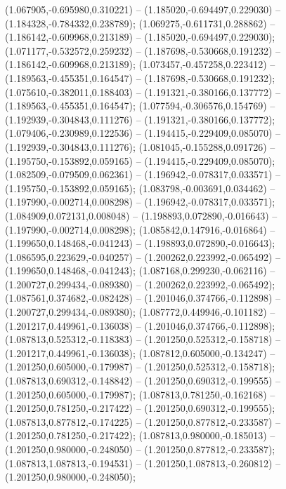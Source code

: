  (1.067905,-0.695980,0.310221) -- (1.185020,-0.694497,0.229030) -- (1.184328,-0.784332,0.238789);
 (1.069275,-0.611731,0.288862) -- (1.186142,-0.609968,0.213189) -- (1.185020,-0.694497,0.229030);
 (1.071177,-0.532572,0.259232) -- (1.187698,-0.530668,0.191232) -- (1.186142,-0.609968,0.213189);
 (1.073457,-0.457258,0.223412) -- (1.189563,-0.455351,0.164547) -- (1.187698,-0.530668,0.191232);
 (1.075610,-0.382011,0.188403) -- (1.191321,-0.380166,0.137772) -- (1.189563,-0.455351,0.164547);
 (1.077594,-0.306576,0.154769) -- (1.192939,-0.304843,0.111276) -- (1.191321,-0.380166,0.137772);
 (1.079406,-0.230989,0.122536) -- (1.194415,-0.229409,0.085070) -- (1.192939,-0.304843,0.111276);
 (1.081045,-0.155288,0.091726) -- (1.195750,-0.153892,0.059165) -- (1.194415,-0.229409,0.085070);
 (1.082509,-0.079509,0.062361) -- (1.196942,-0.078317,0.033571) -- (1.195750,-0.153892,0.059165);
 (1.083798,-0.003691,0.034462) -- (1.197990,-0.002714,0.008298) -- (1.196942,-0.078317,0.033571);
 (1.084909,0.072131,0.008048) -- (1.198893,0.072890,-0.016643) -- (1.197990,-0.002714,0.008298);
 (1.085842,0.147916,-0.016864) -- (1.199650,0.148468,-0.041243) -- (1.198893,0.072890,-0.016643);
 (1.086595,0.223629,-0.040257) -- (1.200262,0.223992,-0.065492) -- (1.199650,0.148468,-0.041243);
 (1.087168,0.299230,-0.062116) -- (1.200727,0.299434,-0.089380) -- (1.200262,0.223992,-0.065492);
 (1.087561,0.374682,-0.082428) -- (1.201046,0.374766,-0.112898) -- (1.200727,0.299434,-0.089380);
 (1.087772,0.449946,-0.101182) -- (1.201217,0.449961,-0.136038) -- (1.201046,0.374766,-0.112898);
 (1.087813,0.525312,-0.118383) -- (1.201250,0.525312,-0.158718) -- (1.201217,0.449961,-0.136038);
 (1.087812,0.605000,-0.134247) -- (1.201250,0.605000,-0.179987) -- (1.201250,0.525312,-0.158718);
 (1.087813,0.690312,-0.148842) -- (1.201250,0.690312,-0.199555) -- (1.201250,0.605000,-0.179987);
 (1.087813,0.781250,-0.162168) -- (1.201250,0.781250,-0.217422) -- (1.201250,0.690312,-0.199555);
 (1.087813,0.877812,-0.174225) -- (1.201250,0.877812,-0.233587) -- (1.201250,0.781250,-0.217422);
 (1.087813,0.980000,-0.185013) -- (1.201250,0.980000,-0.248050) -- (1.201250,0.877812,-0.233587);
 (1.087813,1.087813,-0.194531) -- (1.201250,1.087813,-0.260812) -- (1.201250,0.980000,-0.248050);
